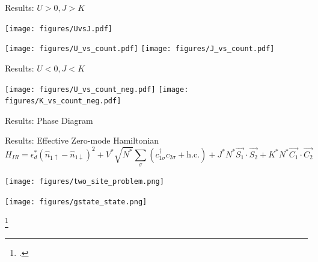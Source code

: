 \documentclass[aspectratio=169]{beamer}
\begin{document}
\begin{frame}{Results: \(U>0, J>K\)}
\begin{minipage}{0.6\textwidth}
\begin{center}
	\texttt{[image: figures/UvsJ.pdf]}
\end{center}
\end{minipage}
\begin{minipage}{0.39\textwidth}
\begin{center}
	\texttt{[image: figures/U\_vs\_count.pdf]}
	\texttt{[image: figures/J\_vs\_count.pdf]}
\end{center}
\end{minipage}
\end{frame}


\begin{frame}{Results: \(U<0, J<K\)}
	\vspace*{30pt}
\begin{center}
	\texttt{[image: figures/U\_vs\_count\_neg.pdf]}
	\texttt{[image: figures/K\_vs\_count\_neg.pdf]}
\end{center}
\end{frame}


\begin{frame}{Results: Phase Diagram}
\begin{center}
	\hspace*{-50pt}\def\svgwidth{0.8\columnwidth}
	
\end{center}
\end{frame}


\begin{frame}{Results: Effective Zero-mode Hamiltonian}
	\vspace*{-30pt}
	\[H_{IR} = \epsilon_d^* \left( \hat n_{1 \uparrow} - \hat n_{1 \downarrow} \right) ^2 + V^*\sqrt{N^*}\sum_{\sigma}\left(c^\dagger_{1\sigma}c_{2\sigma} + \text{h.c.} \right) + J^*N^*\vec{S_1}\cdot\vec{S_2} + K^*N^*\vec{C_1}\cdot\vec{C_2}\]
\hspace*{-15pt}
	\begin{minipage}{0.5\textwidth}
	{\centering
	\texttt{[image: figures/two\_site\_problem.png]}}
\end{minipage}
\hspace*{25pt}
\begin{minipage}{0.45\textwidth}
	{\centering
	\texttt{[image: figures/gstate\_state.png]}}
\end{minipage}

\footcite{wilson,hrk-nrg,taraphder}

\end{frame}
\end{document}
